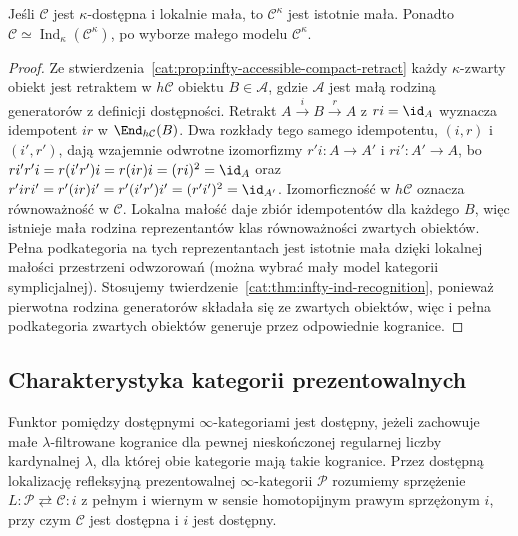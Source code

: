\begin{wniosek}\label{cat:cor:infty-accessible-essentially-small}
Jeśli $\mathcal C$ jest $\kappa$-dostępna i lokalnie mała, to $\mathcal C^\kappa$ jest istotnie mała. Ponadto $\mathcal C\simeq\operatorname{Ind}_\kappa(\mathcal C^\kappa)$, po wyborze małego modelu $\mathcal C^\kappa$.
\end{wniosek}
\begin{proof}
Ze stwierdzenia~\ref{cat:prop:infty-accessible-compact-retract} każdy $\kappa$-zwarty obiekt jest retraktem w $h\mathcal C$ obiektu $B\in\mathcal A$, gdzie $\mathcal A$ jest małą rodziną generatorów z definicji dostępności. Retrakt $A\xrightarrow{i}B\xrightarrow{r}A$ z $ri=\id_A$ wyznacza idempotent $ir$ w $\End_{h\mathcal C}(B)$. Dwa rozkłady tego samego idempotentu, $(i,r)$ i $(i',r')$, dają wzajemnie odwrotne izomorfizmy $r'i:A\to A'$ i $ri':A'\to A$, bo $ri'r'i=r(i'r')i=r(ir)i=(ri)^2=\id_A$ oraz $r'iri'=r'(ir)i'=r'(i'r')i'=(r'i')^2=\id_{A'}$. Izomorficzność w $h\mathcal C$ oznacza równoważność w $\mathcal C$. Lokalna małość daje zbiór idempotentów dla każdego $B$, więc istnieje mała rodzina reprezentantów klas równoważności zwartych obiektów. Pełna podkategoria na tych reprezentantach jest istotnie mała dzięki lokalnej małości przestrzeni odwzorowań (można wybrać mały model kategorii symplicjalnej). Stosujemy twierdzenie~\ref{cat:thm:infty-ind-recognition}, ponieważ pierwotna rodzina generatorów składała się ze zwartych obiektów, więc i pełna podkategoria zwartych obiektów generuje przez odpowiednie kogranice.
\end{proof}

\subsection{Charakterystyka kategorii prezentowalnych}

\begin{definicja}\label{cat:def:infty-accessible-functor}
Funktor pomiędzy dostępnymi $\infty$-kategoriami jest dostępny, jeżeli zachowuje małe $\lambda$-filtrowane kogranice dla pewnej nieskończonej regularnej liczby kardynalnej $\lambda$, dla której obie kategorie mają takie kogranice. Przez dostępną lokalizację refleksyjną prezentowalnej $\infty$-kategorii $\mathcal P$ rozumiemy sprzężenie $L:\mathcal P\rightleftarrows\mathcal C:i$ z pełnym i wiernym w sensie homotopijnym prawym sprzężonym $i$, przy czym $\mathcal C$ jest dostępna i $i$ jest dostępny.
\end{definicja}

